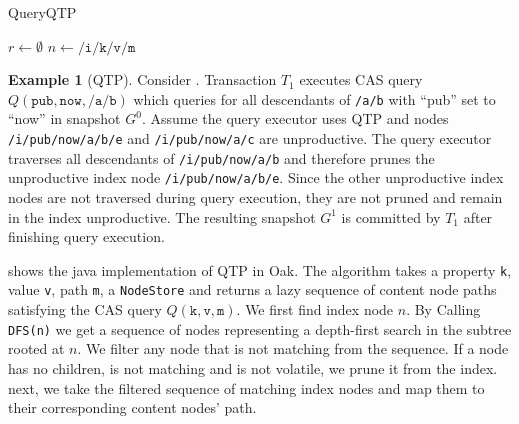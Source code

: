 \documentclass[abstracton,12pt]{scrartcl}
\theoremstyle{definition}
\newtheorem{example}{Example}
\begin{document}
\begin{algorithm}
  \caption{QueryQTP}
  \DontPrintSemicolon
  $r \longleftarrow \emptyset$\;
  $n \longleftarrow \texttt{/i/k/v/m}$\;
  \;
  \label{algo:query_qtp_wapi}
\end{algorithm}

\begin{example}[QTP]
  Consider . Transaction $T_1$ executes CAS query
  $Q(\texttt{pub},\texttt{now},\texttt{/a/b})$ which queries for all descendants
  of \texttt{/a/b} with ``pub'' set to ``now'' in snapshot $G^0$. Assume the
  query executor uses QTP and nodes \texttt{/i/pub/now/a/b/e} and
  \texttt{/i/pub/now/a/c} are unproductive. The
  query executor traverses all descendants of \texttt{/i/pub/now/a/b} and
  therefore prunes the unproductive index node \texttt{/i/pub/now/a/b/e}. Since
  the other unproductive index nodes are not traversed during query execution,
  they are not pruned and remain in the index unproductive. The resulting
  snapshot $G^1$ is committed by $T_1$ after finishing query execution.
\end{example}


 shows the java implementation of QTP in Oak. The algorithm
takes a property \texttt{k}, value \texttt{v}, path \texttt{m}, a
\texttt{NodeStore} and returns a lazy sequence of content node paths satisfying
the CAS query $Q(\texttt{k},\texttt{v},\texttt{m})$. We first find index node
$n$. By Calling \texttt{DFS(n)} we get a sequence of nodes representing a
depth-first search in the subtree rooted at $n$. We filter any node that is not
matching from the sequence. If a node has no children, is not matching and is
not volatile, we prune it from the index. next, we take the filtered sequence of
matching index nodes and map them to their corresponding content nodes' path.
\end{document}
